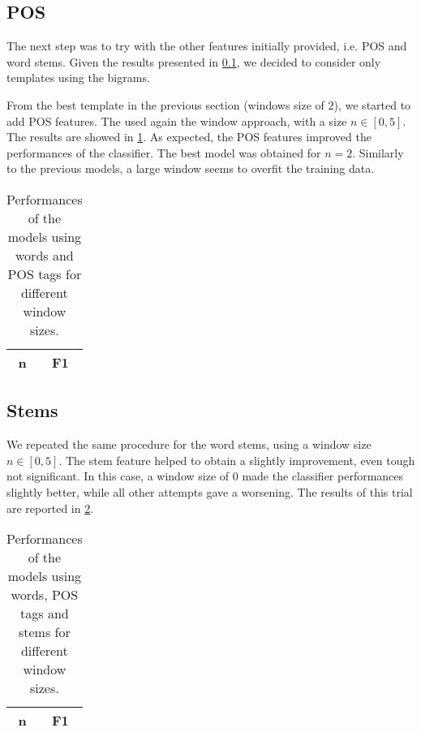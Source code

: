 \subsection{POS}
\label{subsection:original}
The next step was to try with the other features initially provided, i.e. \ac{POS} and word stems.
Given the results presented in \cref{subsection:original}, we decided to consider only templates using the bigrams.

From the best template in the previous section (windows size of $2$), we started to add \ac{POS} features.
The used again the window approach, with a size $n \in [0,5]$.
The results are showed in \cref{tab:pos}.
As expected, the \ac{POS} features improved the performances of the classifier.
The best model was obtained for $n = 2$.
Similarly to the previous models, a large window seems to overfit the training data.

\begin{table}[h]
	\centering
    \begin{tabular}{ c c }
    	\toprule
    		\multicolumn{1}{c}{n} & \multicolumn{1}{c}{F1} \\
    	\midrule
            
    	\bottomrule
	\end{tabular}
    \caption{Performances of the models using words and POS tags for different window sizes.}
	\label{tab:pos}
\end{table}

\subsection{Stems}
We repeated the same procedure for the word stems, using a window size $n \in [0,5]$.
The stem feature helped to obtain a slightly improvement, even tough not significant.
In this case, a window size of $0$ made the classifier performances slightly better, while all other attempts gave a worsening.
The results of this trial are reported in \cref{tab:stems}.

\begin{table}[h]
	\centering
    \begin{tabular}{ c c }
    	\toprule
    		\multicolumn{1}{c}{n} & \multicolumn{1}{c}{F1} \\
    	\midrule
            
    	\bottomrule
	\end{tabular}
    \caption{Performances of the models using words, POS tags and stems for different window sizes.}
	\label{tab:stems}
\end{table}

